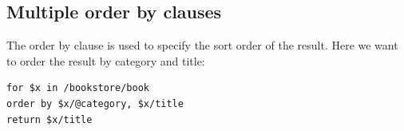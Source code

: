 \documentclass{pgnotes}
\begin{document}
\subsection{Multiple order by clauses}

The order by clause is used to specify the sort order of the result. Here we want to order the result by category and title:

\begin{verbatim}
for $x in /bookstore/book
order by $x/@category, $x/title
return $x/title
\end{verbatim}



\end{document}
